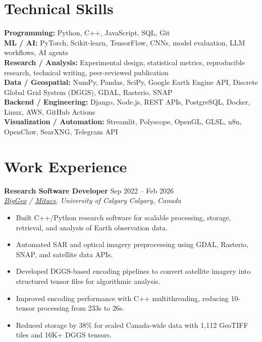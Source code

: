 \documentclass[a4paper,10pt]{article}
\newcommand{\resumeSubheading}[4]{
    \textbf{#1} \hfill #2 \\
    \textit{#3} \hfill \textit{#4}
}
\begin{document}
\section*{Technical Skills}

\textbf{Programming:} Python, C++, JavaScript, SQL, Git \\
\textbf{ML / AI:} PyTorch, Scikit-learn, TensorFlow, CNNs, model evaluation, LLM workflows, AI agents \\
\textbf{Research / Analysis:} Experimental design, statistical metrics, reproducible research, technical writing, peer-reviewed publication \\
\textbf{Data / Geospatial:} NumPy, Pandas, SciPy, Google Earth Engine API, Discrete Global Grid System (DGGS), GDAL, Rasterio, SNAP \\
\textbf{Backend / Engineering:} Django, Node.js, REST APIs, PostgreSQL, Docker, Linux, AWS, GitHub Actions \\
\textbf{Visualization / Automation:} Streamlit, Polyscope, OpenGL, GLSL, n8n, OpenClaw, SearXNG, Telegram API


\section*{Work Experience}

\resumeSubheading
{Research Software Developer}
{Sep 2022 -- Feb 2026}
{\href{https://biggeo.com}{BigGeo} / \href{https://www.mitacs.ca/}{Mitacs}, University of Calgary}
{Calgary, Canada}
\begin{itemize}[leftmargin=0.25in]
    \item Built C++/Python research software for scalable processing, storage, retrieval, and analysis of Earth observation data.
    \item Automated SAR and optical imagery preprocessing using GDAL, Rasterio, SNAP, and satellite data APIs.
    \item Developed DGGS-based encoding pipelines to convert satellite imagery into structured tensor files for algorithmic analysis.
    \item Improved encoding performance with C++ multithreading, reducing 10-tensor processing from 233s to 26s.
    \item Reduced storage by 38\% for scaled Canada-wide data with 1,112 GeoTIFF tiles and 16K+ DGGS tensors.
\end{itemize}
\end{document}
